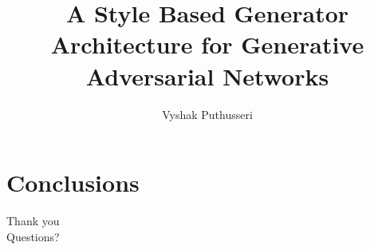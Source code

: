 \documentclass[10pt]{beamer}
\title{A Style Based Generator Architecture for Generative Adversarial Networks}
\date{\regno}
\author{Vyshak Puthusseri}
\institute{MCA CET}
\begin{document}
\maketitle








\section{Conclusions}



\begin{frame}[standout]
  Thank you \\ Questions?
\end{frame}
\end{document}
